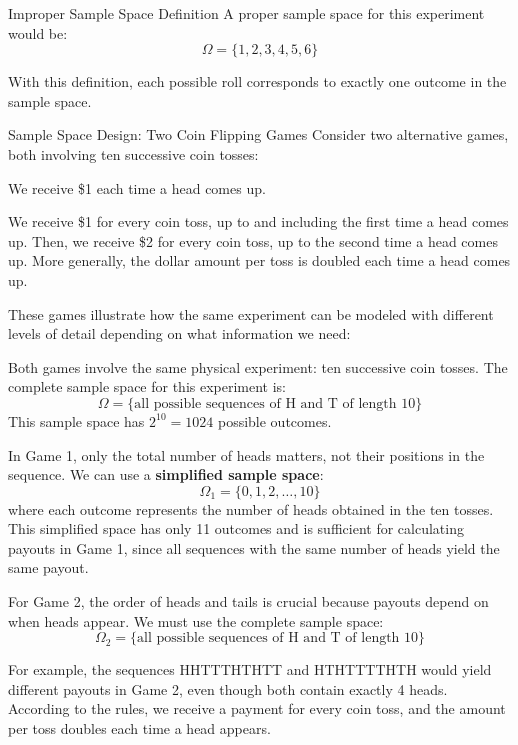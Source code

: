 \begin{itemize}
\begin{exampleboxbreak}{Improper Sample Space Definition}
A proper sample space for this experiment would be:
\[ \Omega = \{1, 2, 3, 4, 5, 6\} \]

With this definition, each possible roll corresponds to exactly one outcome in the sample space.
\end{exampleboxbreak}
\begin{exampleboxbreak}{Sample Space Design: Two Coin Flipping Games}
Consider two alternative games, both involving ten successive coin tosses:

 We receive \$1 each time a head comes up.

 We receive \$1 for every coin toss, up to and including the first time a head comes up. Then, we receive \$2 for every coin toss, up to the second time a head comes up. More generally, the dollar amount per toss is doubled each time a head comes up.

These games illustrate how the same experiment can be modeled with different levels of detail depending on what information we need:

Both games involve the same physical experiment: ten successive coin tosses. The complete sample space for this experiment is:
\[ \Omega = \{\text{all possible sequences of H and T of length 10}\} \]
This sample space has $2^{10} = 1024$ possible outcomes.

In Game 1, only the total number of heads matters, not their positions in the sequence. We can use a \textbf{simplified sample space}:
\[ \Omega_1 = \{0, 1, 2, \ldots, 10\} \]
where each outcome represents the number of heads obtained in the ten tosses. This simplified space has only 11 outcomes and is sufficient for calculating payouts in Game 1, since all sequences with the same number of heads yield the same payout.

For Game 2, the order of heads and tails is crucial because payouts depend on when heads appear. We must use the complete sample space:
\[ \Omega_2 = \{\text{all possible sequences of H and T of length 10}\} \]

For example, the sequences HHTTTHTHTT and HTHTTTTHTH would yield different payouts in Game 2, even though both contain exactly 4 heads. According to the rules, we receive a payment for every coin toss, and the amount per toss doubles each time a head appears. 


\end{exampleboxbreak}
\end{itemize}
